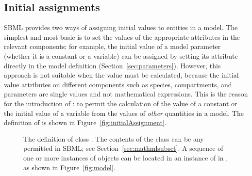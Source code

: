 \subsection{Initial assignments}
\label{sec:initialAssignment}

SBML \thisLV provides two ways of assigning initial values to
entities in a model.  The simplest and most basic is to set the
values of the appropriate attributes in the relevant
components; for example, the initial value of a model parameter
(whether it is a constant or a variable) can be assigned by
setting its  attribute directly in the model definition
(Section~\ref{sec:parameters}).  However, this approach is not
suitable when the value must be calculated, because the initial
value attributes on different components such as species,
compartments, and parameters are single values and not
mathematical expressions.  This is the reason for the introduction
of \InitialAssignment: to permit the calculation of the value of a
constant or the initial value of a variable from the values of
\emph{other} quantities in a model.  The definition of
\InitialAssignment is shown in Figure~\vref{fig:initialAssignment}.

\begin{figure}[htb]
  \centering
  \small
  \vspace*{-1ex}
  \caption{The definition of class \InitialAssignment.  The
    contents of the  class can be any \mathml
    permitted in SBML; see
    Section~\protect\ref{sec:mathmlsubset}.  A
    sequence of one or more instances of \InitialAssignment
    objects can be located in an instance of
    \ListOfInitialAssignments in \Model, as shown in
    Figure~\protect\ref{fig:model}.}
  \label{fig:initialAssignment}
\end{figure}

